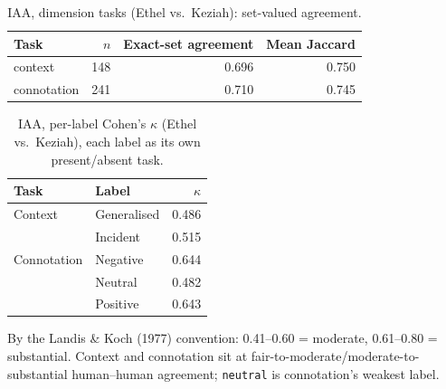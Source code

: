 \begin{table}[htbp]
\centering
\footnotesize
\setlength{\tabcolsep}{4pt}
\caption{IAA, dimension tasks (Ethel vs.\ Keziah): set-valued agreement.}
\label{tab:iaa-dimension}
\begin{tabular}{@{} l r r r @{}}
\toprule
Task & $n$ & Exact-set agreement & Mean Jaccard \\
\midrule
context & 148 & 0.696 & 0.750 \\
connotation & 241 & 0.710 & 0.745 \\
\bottomrule
\end{tabular}
\end{table}

\begin{table}[htbp]
\centering
\footnotesize
\setlength{\tabcolsep}{4pt}
\caption{IAA, per-label Cohen's $\kappa$ (Ethel vs.\ Keziah), each label as its own present/absent task.}
\label{tab:iaa-per-label}
\begin{tabular}{@{} l l r @{}}
\toprule
Task & Label & $\kappa$ \\
\midrule
Context & Generalised & 0.486 \\
& Incident & 0.515 \\
\midrule
Connotation & Negative & 0.644 \\
& Neutral & 0.482 \\
& Positive & 0.643 \\
\bottomrule
\end{tabular}

\vspace{2pt}
\raggedright\footnotesize
By the Landis \& Koch (1977) convention: 0.41--0.60 = moderate, 0.61--0.80 = substantial. Context and connotation sit at fair-to-moderate/moderate-to-substantial human--human agreement; \texttt{neutral} is connotation's weakest label.
\end{table}



